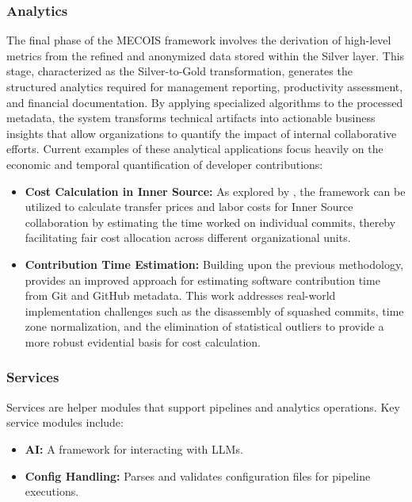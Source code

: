 \subsubsection{Analytics}
\label{subsubsec:analytics}
The final phase of the MECOIS framework involves the derivation of high-level metrics from the refined and anonymized data stored within the Silver layer. This stage, characterized as the Silver-to-Gold transformation, generates the structured analytics required for management reporting, productivity assessment, and financial documentation. By applying specialized algorithms to the processed metadata, the system transforms technical artifacts into actionable business insights that allow organizations to quantify the impact of internal collaborative efforts.
Current examples of these analytical applications focus heavily on the economic and temporal quantification of developer contributions:
\begin{itemize}
	 \item \textbf{Cost Calculation in Inner Source:} As explored by \textcite{analytic_cost}, the framework can be utilized to calculate transfer prices and labor costs for Inner Source collaboration by estimating the time worked on individual commits, thereby facilitating fair cost allocation across different organizational units.
	  \item \textbf{Contribution Time Estimation:} Building upon the previous methodology, \textcite{analytic_contribution} provides an improved approach for estimating software contribution time from Git and GitHub metadata. This work addresses real-world implementation challenges such as the disassembly of squashed commits, time zone normalization, and the elimination of statistical outliers to provide a more robust evidential basis for cost calculation.
\end{itemize}


\subsubsection{Services}
\label{subsubsec:services}

Services are helper modules that support pipelines and analytics operations. Key service modules include:

\begin{itemize}
	\item \textbf{AI:} A framework for interacting with \acp{LLM}.
	\item \textbf{Config Handling:} Parses and validates configuration files for pipeline executions.
\end{itemize}

